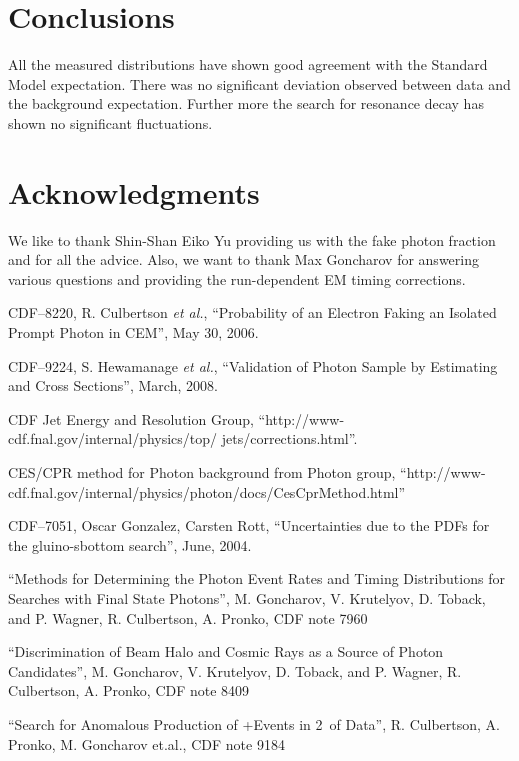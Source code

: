\documentclass[11pt]{article}
\begin{document}
\section{Conclusions}
All the measured distributions have shown good agreement with the Standard Model expectation. There was no significant deviation observed between data and the background expectation. Further more the search for resonance decay has shown no significant fluctuations.

\section{Acknowledgments}
We like to thank Shin-Shan Eiko Yu providing us with the fake photon fraction and for all the advice. Also, we want to thank Max Goncharov for answering various questions and providing the run-dependent EM timing corrections.


\begin{thebibliography}{99}

 CDF--8220, R. Culbertson {\it et al.}, ``Probability of an Electron Faking an Isolated Prompt Photon in CEM'', May 30, 2006.

 CDF--9224, S. Hewamanage {\it et al.}, ``Validation of Photon Sample by Estimating \wen and  \zee  Cross Sections'', March, 2008.

 CDF Jet Energy and Resolution Group, ``http://www-cdf.fnal.gov/internal/physics/top/ jets/corrections.html''.

 CES/CPR method for Photon background from Photon group, ``http://www-cdf.fnal.gov/internal/physics/photon/docs/CesCprMethod.html''

 CDF--7051, Oscar Gonzalez, Carsten Rott, ``Uncertainties due to the PDFs for the gluino-sbottom search'', June, 2004.

``Methods for Determining the Photon Event Rates and Timing Distributions for Searches with Final State Photons'', M. Goncharov, V. Krutelyov, D. Toback, and P. Wagner, R. Culbertson, A. Pronko, CDF note 7960

``Discrimination of Beam Halo and Cosmic Rays as a Source of Photon Candidates'', M. Goncharov, V. Krutelyov, D. Toback, and P. Wagner, R. Culbertson, A. Pronko, CDF note 8409

``Search for Anomalous Production of \pho\pho+\met Events in 2~\fbi of Data'', R. Culbertson, A. Pronko, M. Goncharov et.al., CDF note 9184


\end{thebibliography}
\end{document}
